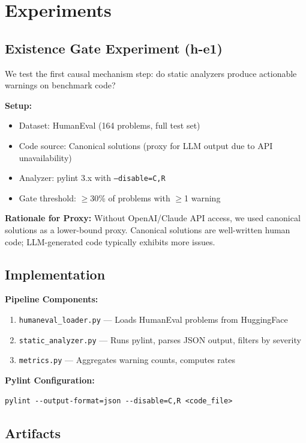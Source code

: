 \section{Experiments}

\subsection{Existence Gate Experiment (h-e1)}

We test the first causal mechanism step: do static analyzers produce actionable warnings on benchmark code?

\textbf{Setup:}
\begin{itemize}
    \item Dataset: HumanEval (164 problems, full test set)
    \item Code source: Canonical solutions (proxy for LLM output due to API unavailability)
    \item Analyzer: pylint 3.x with \texttt{--disable=C,R}
    \item Gate threshold: $\geq$30\% of problems with $\geq$1 warning
\end{itemize}

\textbf{Rationale for Proxy:} Without OpenAI/Claude API access, we used canonical solutions as a lower-bound proxy. Canonical solutions are well-written human code; LLM-generated code typically exhibits more issues.

\subsection{Implementation}

\textbf{Pipeline Components:}
\begin{enumerate}
    \item \texttt{humaneval\_loader.py} --- Loads HumanEval problems from HuggingFace
    \item \texttt{static\_analyzer.py} --- Runs pylint, parses JSON output, filters by severity
    \item \texttt{metrics.py} --- Aggregates warning counts, computes rates
\end{enumerate}

\textbf{Pylint Configuration:}
\begin{verbatim}
pylint --output-format=json --disable=C,R <code_file>
\end{verbatim}

\subsection{Artifacts}

